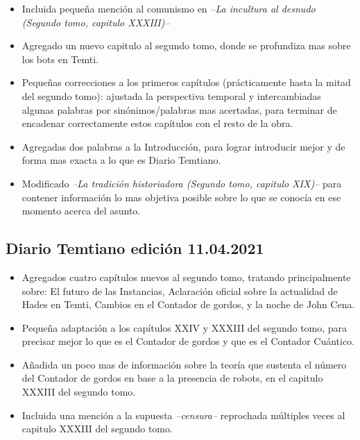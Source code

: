\documentclass[
  spanish,
]{book}
\begin{document}
\begin{itemize}
\item[$\boxtimes$]
  Incluida pequeña mención al comunismo en \emph{--La incultura al desnudo (Segundo tomo, capitulo XXXIII)--}
\item[$\boxtimes$]
  Agregado un nuevo capitulo al segundo tomo, donde se profundiza mas sobre los bots en Temti.
\item[$\boxtimes$]
  Pequeñas correcciones a los primeros capítulos (prácticamente hasta la mitad del segundo tomo): ajustada la perspectiva temporal y intercambiadas algunas palabras por sinónimos/palabras mas acertadas, para terminar de encadenar correctamente estos capítulos con el resto de la obra.
\item[$\boxtimes$]
  Agregadas dos palabras a la Introducción, para lograr introducir mejor y de forma mas exacta a lo que es Diario Temtiano.
\item[$\boxtimes$]
  Modificado \emph{--La tradición historiadora (Segundo tomo, capitulo XIX)--} para contener información lo mas objetiva posible sobre lo que se conocía en ese momento acerca del asunto.
\end{itemize}

\hypertarget{diario-temtiano-ediciuxf3n-11.04.2021}{%
\subsection*{Diario Temtiano edición 11.04.2021}\label{diario-temtiano-ediciuxf3n-11.04.2021}}

\begin{itemize}
\item[$\boxtimes$]
  Agregados cuatro capítulos nuevos al segundo tomo, tratando principalmente sobre: El futuro de las Instancias, Aclaración oficial sobre la actualidad de Hades en Temti, Cambios en el Contador de gordos, y la noche de John Cena.
\item[$\boxtimes$]
  Pequeña adaptación a los capítulos XXIV y XXXIII del segundo tomo, para precisar mejor lo que es el Contador de gordos y que es el Contador Cuántico.
\item[$\boxtimes$]
  Añadida un poco mas de información sobre la teoría que sustenta el número del Contador de gordos en base a la presencia de robots, en el capitulo XXXIII del segundo tomo.
\item[$\boxtimes$]
  Incluida una mención a la supuesta \emph{--censura--} reprochada múltiples veces al capitulo XXXIII del segundo tomo.
\end{itemize}
\end{document}
